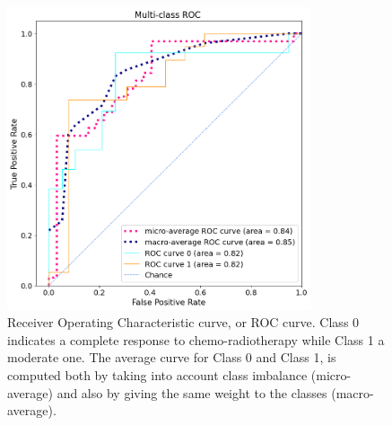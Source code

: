 \documentclass{standalone}
\begin{document}
\begin{figure}[htp]

    \centering
    \includegraphics[width=0.8\textwidth]{../images/ROC.png}

    \caption{Receiver Operating Characteristic curve, or ROC curve.
	Class 0 indicates a complete response to chemo-radiotherapy while Class 1 a moderate one.
	The average curve for Class 0 and Class 1, is computed both by taking into account class imbalance (micro-average) and also by giving the same weight to the classes (macro-average).}
    \label{ROC}
    
\end{figure}
\end{document}
